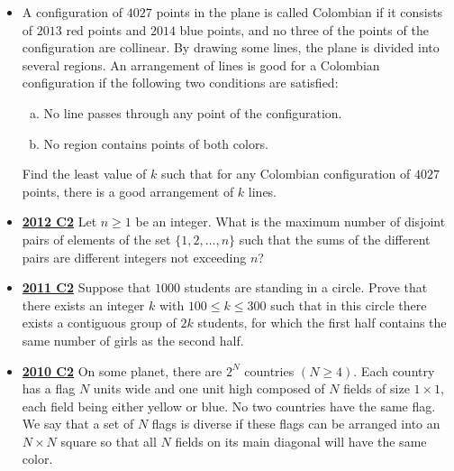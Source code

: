 \documentclass[11pt]{scrartcl}
\begin{document}
\begin{itemize}[leftmargin=*]
    Prove that after $m2^{m -1}$ steps, the sum of the numbers on all the sheets is at least $4^m$.
    \item {} A configuration of $4027$ points in the plane is called Colombian if it consists of $2013$ red points and $2014$ blue points, and no three of the points of the configuration are collinear. By drawing some lines, the plane is divided into several regions. An arrangement of lines is good for a Colombian configuration if the following two conditions are satisfied: 
    \begin{enumerate}[(a)]
        \item No line passes through any point of the configuration.
        \item No region contains points of both colors.
    \end{enumerate} 
    Find the least value of $k$ such that for any Colombian configuration of $4027$ points, there is a good arrangement of $k$ lines.
    \item \href{https://artofproblemsolving.com/community/c6h546169p3160560}{\textbf{2012 C2}} Let $n \geqslant  1$ be an integer. What is the maximum number of disjoint pairs of elements of the set $\{ 1,2,\dots , n \}$ such that the sums of the different pairs are different integers not exceeding $n$?
    \item \href{https://artofproblemsolving.com/community/c6h488626p2738008}{\textbf{2011 C2}} Suppose that $1000$ students are standing in a circle. Prove that there exists an integer $k$ with $100 \leqslant k \leqslant 300$ such that in this circle there exists a contiguous group of $2k$ students, for which the first half contains the same number of girls as the second half.
    \item \href{https://artofproblemsolving.com/community/c6h418686p2362296}{\textbf{2010 C2}} On some planet, there are $2^N$ countries $(N \geqslant  4).$ Each country has a flag $N$ units wide and one unit high composed of $N$ fields of size $1 \times 1,$ each field being either yellow or blue. No two countries have the same flag. We say that a set of $N$ flags is diverse if these flags can be arranged into an $N \times N$ square so that all $N$ fields on its main diagonal will have the same color. 
    

\end{itemize}
\end{document}

